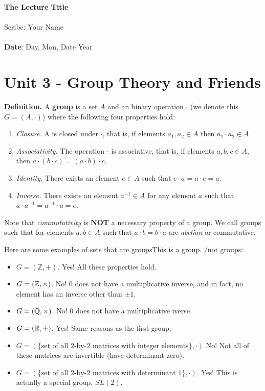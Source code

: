 \documentclass[11pt,twosided]{article}
\def\titlestring{The Lecture Title}
\def\scribestring{Your Name}
\def\datestring{Day, Mon, Date Year}
\begin{document}
\thispagestyle{plain}  %

\noindent
{\LARGE \textbf{\titlestring}}\\\\
%
{\Large Scribe: \scribestring}\\ \\
{\textbf{Date}: \datestring}


\noindent

\section{Unit 3 - Group Theory and Friends}
\textbf{Definition. } A \textbf{group} is a set $A$ and an binary operation $\cdot$ (we denote this $G = (A, \cdot)$) where the following four properties hold: 
\begin{enumerate}
\item \textit{Closure.} A is closed under $\cdot$, that is, if elements $a_1, a_2 \in A$ then $a_1 \cdot a_2 \in A$. 
\item \textit{Associativity. } The operation $\cdot$ is associative, that is, if elements $a, b, c \in A$, then $a \cdot (b \cdot c) = (a \cdot b) \cdot c$. 
\item \textit{Identity. } There exists an element $e \in A$ such that $e \cdot a = a \cdot e = a$. 
\item \textit{Inverse. } There exists an element $a^{-1} \in A$ for any element $a$ such that $a \cdot a^{-1} = a^{-1} \cdot a = e$. 
\end{enumerate}  
Note that \textit{commutativity} is \textbf{NOT} a necessary property of a group. We call groups such that for elements $a, b \in A$ such that $a \cdot b = b \cdot a$ are \textit{abelian} or commutative.

Here are some examples of sets that are groupsThis is a group. /not groups: 
\begin{itemize}
\item $G = (\mathbb{Z}, +)$. Yes! All these properties hold. 
\item $G = (\mathbb Z, \times)$. No! $0$ does not have a multiplicative inverse, and in fact, no element has an inverse other than $\pm 1$. 
\item $G = (\mathbb Q, \times)$. No! $0$ does not have a multiplicative iverse. 
\item $G = (\mathbb R, +)$. Yes! Same reasons as the first group. 
\item $G = (\{\text{set of all 2-by-2 matrices with integer elements} \}, \cdot)$ No! Not all of these matrices are invertible (have determinant zero). 
\item $G = (\{\text{set of all 2-by-2 matrices with determinant 1} \}, \cdot)$. Yes! This is actually a special group, $SL(2)$. 
\end{itemize}
\end{document}
